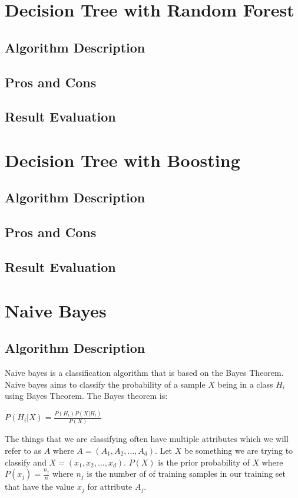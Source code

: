 \documentclass[paper=letter, fontsize=11pt]{article}
\numberwithin{equation}{section}		%
\numberwithin{figure}{section}			%
\numberwithin{table}{section}				%
\begin{document}
\section{Decision Tree with Random Forest}
\subsection{Algorithm Description}
\subsection{Pros and Cons}
\subsection{Result Evaluation}

\section{Decision Tree with Boosting}
\subsection{Algorithm Description}
\subsection{Pros and Cons}

\subsection{Result Evaluation}

\section{Naive Bayes}
\subsection{Algorithm Description}
Naive bayes is a classification algorithm that is based on the Bayes Theorem. Naive bayes aims to classify the probability of a sample $X$ being in a class $H_i$ using Bayes Theorem. The Bayes theorem is:\\
\begin{center} $P(H_i|X) = \frac{P(H_i)P(X|H_i)}{P(X)}$ \end{center}

\noindent The things that we are classifying often have multiple attributes which we will refer to as $A$ where $A = (A_1,A_2,...,A_d)$. Let $X$ be something we are trying to classify and $X = (x_1, x_2, ..., x_d)$. $P(X)$ is the prior probability of $X$ where $P(x_j) = \frac{n_j}{n}$ where $n_j$ is the number of of training samples in our training set that have the value $x_j$ for attribute $A_j$. 
\end{document}
